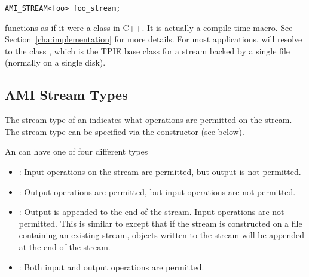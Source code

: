 \begin{verbatim}
AMI_STREAM<foo> foo_stream;
\end{verbatim}

 functions as if it were a class in C++. It
is actually a compile-time macro. See
Section~\ref{cha:implementation} for more details. For most
applications,  will resolve to the class
, which is the TPIE base class for
a stream backed by a single file (normally on a single
disk).


\subsection{AMI Stream Types}

The stream type of an  indicates what
operations are permitted on the stream.
The stream type can be specified via the
constructor (see below).  


An  can have one of four different types
\begin{itemize}
    
    \item {}: Input operations on
    the stream are permitted, but output is not permitted.
    
    \item {}: Output operations are
    permitted, but input operations are not permitted. 
    
    \item {}: Output is appended
    to the end of the stream. Input operations are not
    permitted. This is similar to
     except that if the stream is
    constructed on a file containing an existing stream,
    objects written to the stream will be appended at the
    end of the stream.

\item {}: Both input and output
    operations are permitted.
\end{itemize}

